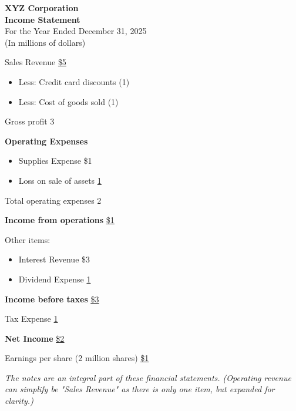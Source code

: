 \small
\begin{tcolorbox}[colframe=black,colback=white,title=Example Income Statement (Classified by Operating \& Non-operating)]
    \begin{center}
        \textbf{XYZ Corporation}\\
        \textbf{Income Statement}\\
        For the Year Ended December 31, 2025\\
        (In millions of dollars)
    \end{center}

    Sales Revenue \hfill \underline{\$5}
    \begin{itemize}[label={}, leftmargin=*]
        \item Less: Credit card discounts \hfill (1)
        \item Less: Cost of goods sold \hfill (1)
    \end{itemize}
    Gross profit \hfill 3

    \textbf{Operating Expenses}
    \begin{itemize}[label={}, leftmargin=*]
        \item Supplies Expense \hfill \$1
        \item Loss on sale of assets \hfill \underline{1}
    \end{itemize}
    Total operating expenses \hfill 2

    \textbf{Income from operations} \hfill \underline{\underline{\$1}}


    Other items:
    \begin{itemize}[label={}, leftmargin=*]
        \item Interest Revenue \hfill \$3
        \item Dividend Expense \hfill \underline{1}
    \end{itemize}
    \textbf{Income before taxes} \hfill \underline{\underline{\$3}}

    Tax Expense \hfill \underline{1}


    \textbf{Net Income} \hfill \underline{\underline{\$2}}

    Earnings per share (2 million shares) \hfill \underline{\underline{\$1}}

    \vspace{1em}

    \textit{\footnotesize{The notes are an integral part of these financial statements. (Operating revenue can simplify be "Sales Revenue" as there is only one item, but expanded for clarity.)}}
\end{tcolorbox}

